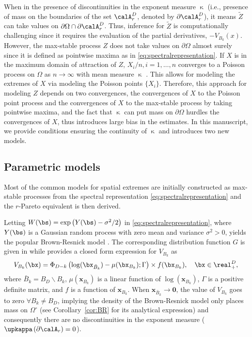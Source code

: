 \documentclass[12pt]{article}
\begin{document}
When in the presence of discontinuities in the exponent measure $\upkappa$ (i.e., presence of mass on the boundaries of the set $\calA_r^D$, denoted by $\partial\calA_r^D$), it means $\tilde Z$ can take values on $\partial\Omega \cap \partial\calA_r^D$. Thus, inference for $\tilde Z$ is computationally challenging since it requires the evaluation of the partial derivatives, $-V_{B_k}(x)$. However, the max-stable process $Z$ does not take values on $\partial\Omega$ almost surely since it is defined as pointwise maxima as in \eqref{eq:spectralrepresentation}. If $X$ is in the maximum domain of attraction of $Z$, ${X_i/n,i=1,\dots,n}$ converges to a Poisson process on $\Omega$ as $n\to\infty$ with mean measure $\upkappa$ \citep[Chapter 6]{Resnick:2006}. This allows for modeling the extremes of $X$ via modeling the Poisson points $\{X_i\}$. Therefore, this approach for modeling $Z$ depends on two convergences, the convergences of $X$ to the Poisson point process and the convergences of $X$ to the max-stable process by taking pointwise maxima, and the fact that $\upkappa$ can put mass on $\partial\Omega$ hurdles the convergences of $X$, thus introduces large bias in the estimates. In this manuscript, we provide conditions ensuring the continuity of $\upkappa$ and introduces two new models.

\subsection{Parametric models}
\label{ssec:models}

Most of the common models for spatial extremes are initially constructed as max-stable processes from the spectral representation \eqref{eq:spectralrepresentation} and the $r$-Pareto equivalent is then derived.

Letting $W(\bs)=\exp \left(Y(\bs) - \sigma^2/2\right)$ in \eqref{eq:spectralrepresentation}, where $Y(\bs)$ is a Gaussian random process with zero mean and variance $\sigma^2>0$, yields the popular Brown-Resnick model \citep{Brown.Resnick:1977, Kabluchko.etal:2009}. The corresponding distribution function $G$ is given in \citet{Huser.Davison:2013a} while \cite{Wadsworth.Tawn:2014} provides a closed form expression for $V_{B_k}$ as
%
$$
V_{B_k}(\bx) = \Phi_{D-k}\left(\log(\bx_{\bar{B}_k}) - \mu(\bx_{B_k});\Gamma \right) \times f(\bx_{B_k}), \quad \bx \in \real_+^D,
$$
%
where $\bar{B}_k = B_D \backslash B_k$, $\mu(\bm x_{B_k})$ is a linear function of $\log(\bm x_{B_k})$, $\Gamma$ is a positive definite matrix, and $f$ is a function of $\bm x_{B_k}$. When $\bm x_{\bar{B}_k}\to \bm 0$, the value of $V_{B_k}$ goes to zero $\forall B_k\neq B_D$, implying the density of the Brown-Resnick model only places mass on $\Omega^\circ$ (see Corollary~\ref{cor:BR} for its analytical expression) and consequently there are no discontinuities in the exponent measure ($\upkappa\left( \partial \calA_r\right)=0$).
\end{document}
